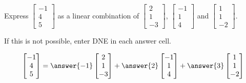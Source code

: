 \documentclass{ximera}
\author{Anna Davis}
\begin{document}
\begin{exercise}
Express $\begin{bmatrix}-1\\4\\5\end{bmatrix}$ as a linear combination of $\begin{bmatrix}2\\1\\-3\end{bmatrix}$, $\begin{bmatrix}-1\\1\\4\end{bmatrix}$ and $\begin{bmatrix}1\\1\\-2\end{bmatrix}$.

If this is not possible, enter DNE in each answer cell.

$$\begin{bmatrix}-1\\4\\5\end{bmatrix}=\answer{-1}\begin{bmatrix}2\\1\\-3\end{bmatrix}+\answer{2}\begin{bmatrix}-1\\1\\4\end{bmatrix}+\answer{3}\begin{bmatrix}1\\1\\-2\end{bmatrix}$$
\end{exercise}
\end{document}
